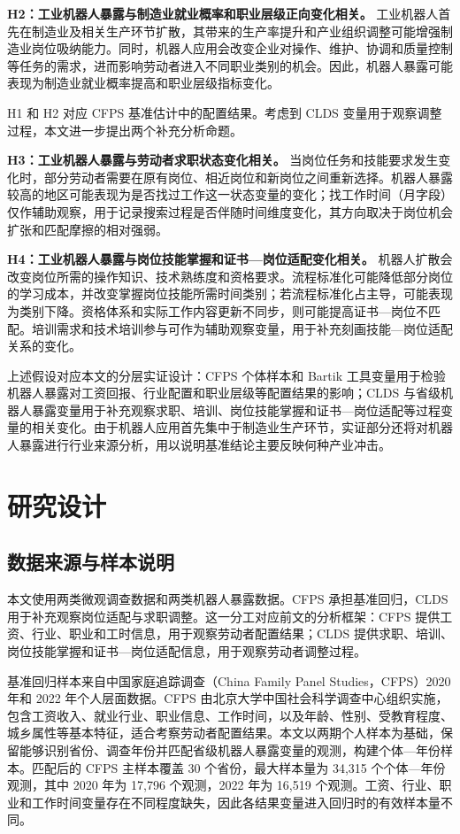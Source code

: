\documentclass[UTF8, zihao=-4, a4paper, openany, fontset=none]{ctexrep}
\numberwithin{equation}{chapter}
\begin{document}
\textbf{H2：工业机器人暴露与制造业就业概率和职业层级正向变化相关。}
工业机器人首先在制造业及相关生产环节扩散，其带来的生产率提升和产业组织调整可能增强制造业岗位吸纳能力。同时，机器人应用会改变企业对操作、维护、协调和质量控制等任务的需求，进而影响劳动者进入不同职业类别的机会。因此，机器人暴露可能表现为制造业就业概率提高和职业层级指标变化。

H1 和 H2 对应 CFPS 基准估计中的配置结果。考虑到 CLDS 变量用于观察调整过程，本文进一步提出两个补充分析命题。

\textbf{H3：工业机器人暴露与劳动者求职状态变化相关。}
当岗位任务和技能要求发生变化时，部分劳动者需要在原有岗位、相近岗位和新岗位之间重新选择。机器人暴露较高的地区可能表现为是否找过工作这一状态变量的变化；找工作时间（月字段）仅作辅助观察，用于记录搜索过程是否伴随时间维度变化，其方向取决于岗位机会扩张和匹配摩擦的相对强弱。

\textbf{H4：工业机器人暴露与岗位技能掌握和证书---岗位适配变化相关。}
机器人扩散会改变岗位所需的操作知识、技术熟练度和资格要求。流程标准化可能降低部分岗位的学习成本，并改变掌握岗位技能所需时间类别；若流程标准化占主导，可能表现为类别下降。资格体系和实际工作内容更新不同步，则可能提高证书---岗位不匹配。培训需求和技术培训参与可作为辅助观察变量，用于补充刻画技能---岗位适配关系的变化。

上述假设对应本文的分层实证设计：CFPS 个体样本和 Bartik 工具变量用于检验机器人暴露对工资回报、行业配置和职业层级等配置结果的影响；CLDS 与省级机器人暴露变量用于补充观察求职、培训、岗位技能掌握和证书---岗位适配等过程变量的相关变化。由于机器人应用首先集中于制造业生产环节，实证部分还将对机器人暴露进行行业来源分析，用以说明基准结论主要反映何种产业冲击。

\chapter{研究设计}\label{ux7814ux7a76ux8bbeux8ba1}

\section{数据来源与样本说明}\label{ux6570ux636eux6765ux6e90ux4e0eux6837ux672cux8bf4ux660e}

本文使用两类微观调查数据和两类机器人暴露数据。CFPS 承担基准回归，CLDS 用于补充观察岗位适配与求职调整。这一分工对应前文的分析框架：CFPS 提供工资、行业、职业和工时信息，用于观察劳动者配置结果；CLDS 提供求职、培训、岗位技能掌握和证书---岗位适配信息，用于观察劳动者调整过程。

基准回归样本来自中国家庭追踪调查（China Family Panel Studies，CFPS）2020 年和 2022 年个人层面数据。CFPS 由北京大学中国社会科学调查中心组织实施，包含工资收入、就业行业、职业信息、工作时间，以及年龄、性别、受教育程度、城乡属性等基本特征，适合考察劳动者配置结果。本文以两期个人样本为基础，保留能够识别省份、调查年份并匹配省级机器人暴露变量的观测，构建个体---年份样本。匹配后的 CFPS 主样本覆盖 30 个省份，最大样本量为 34,315 个个体---年份观测，其中 2020 年为 17,796 个观测，2022 年为 16,519 个观测。工资、行业、职业和工作时间变量存在不同程度缺失，因此各结果变量进入回归时的有效样本量不同。
\end{document}
